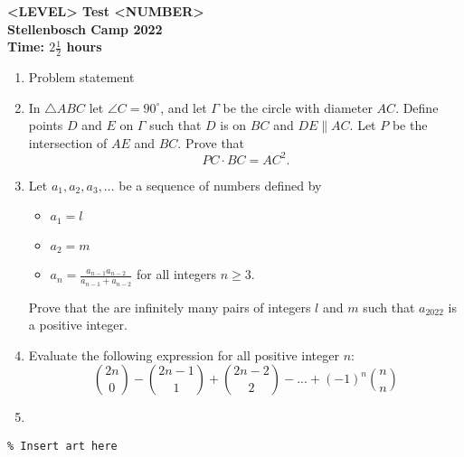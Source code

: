 \documentclass{article}
\begin{document}
\thispagestyle{empty}

\begin{center}
  \textbf{\Large <LEVEL> Test <NUMBER>}
  \\ \vspace{1em}
  \textbf{\large Stellenbosch Camp 2022}
  \\ \vspace{1em}
  \textbf{\large Time: $2\frac{1}{2}$ hours}
\end{center}

\bigskip

\vfill

\begin{enumerate}[itemsep=\fill]

\item %
Problem statement


\item %
In $\triangle ABC$ let $\angle C = 90^\circ$, and let $\Gamma$ be the circle with diameter $AC$. Define points $D$ and $E$ on $\Gamma$ such that $D$ is on $BC$ and $DE \parallel AC$. Let $P$ be the intersection of $AE$ and $BC$. Prove that
\[ PC \cdot BC = AC^2. \]

\vspace{0pt}


\item %
Let $a_1, a_2, a_3, \dots$ be a sequence of numbers defined by 
\begin{itemize}
	\item $a_1 = l$
	\item $a_2 = m$
	\item $a_n = \frac{a_{n-1}a_{n-2}}{a_{n-1}+a_{n-2}}$ for all integers $n \geq 3$.
\end{itemize}
Prove that the are infinitely many pairs of integers $l$ and $m$ such that $a_{2022}$ is a positive integer.

\item %
Evaluate the following expression for all positive integer $n$:
\[ {2n \choose 0} -{2n-1 \choose 1}+{2n-2 \choose 2}-...+(-1)^n{n \choose n} \]


\item %

\end{enumerate}


\vfill
\centering
\small
\begin{BVerbatim}
\end{BVerbatim}
\end{document}
